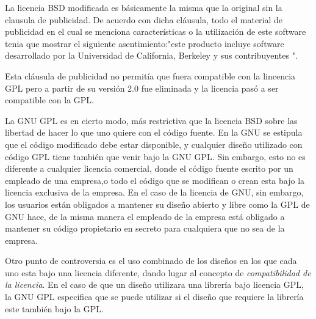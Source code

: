 \documentclass[a4paper,11pt]{article}
\begin{document}
La licencia BSD modificada es básicamente la misma que la original sin la clausula de publicidad. De acuerdo con dicha cláusula, todo el material de publicidad en el cual se menciona características o la utilización de este software tenia que mostrar el siguiente asentimiento:"este producto incluye software desarrollado por la Universidad de California, Berkeley y sus contribuyentes ".

Esta cláusula de publicidad no permitía que fuera compatible con la lincencia GPL pero a partir de su versión 2.0 fue eliminada y la licencia pasó a ser compatible con la GPL.

La GNU GPL es en cierto modo, más restrictiva que la licencia BSD sobre las libertad de hacer lo que uno quiere con el código fuente. En la GNU se estipula que el código modificado debe estar disponible, y cualquier diseño utilizado con código GPL tiene también que venir bajo la GNU GPL. Sin embargo, esto no es diferente a cualquier licencia comercial, donde el código fuente escrito por un empleado de una empresa,o todo el código que se modifican o crean esta bajo la licencia exclusiva de la empresa. En el caso de la licencia de GNU, sin embargo, los usuarios están obligados a mantener su diseño abierto y libre como la GPL de GNU hace, de la misma manera el empleado de la empresa está obligado a mantener su código propietario en secreto para cualquiera que no sea de la  empresa.

Otro punto de controversia es el uso combinado de los diseños en los que cada uno esta bajo una licencia diferente, dando lugar al concepto de \textit{compatibilidad de la licencia}. En el caso de que un diseño utilizara una librería bajo licencia GPL, la GNU GPL especifica que se puede utilizar si el diseño  que requiere la librería este también bajo la GPL. 
\end{document}
